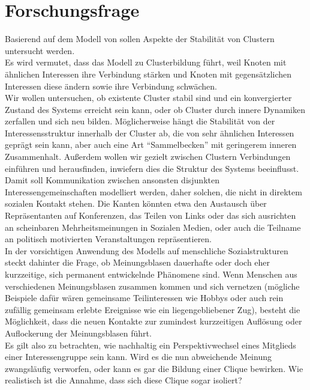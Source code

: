 \documentclass[11pt, a4paper]{scrartcl}
\begin{document}
\section{Forschungsfrage}

Basierend auf dem Modell von \autocite{Koehler-Bussmeier2018} sollen Aspekte der Stabilität von Clustern untersucht werden.
\\
Es wird vermutet, dass das Modell zu Clusterbildung führt, weil Knoten mit ähnlichen Interessen ihre Verbindung stärken und Knoten mit gegensätzlichen Interessen diese ändern sowie ihre Verbindung schwächen.
\\
Wir wollen untersuchen, ob existente Cluster stabil sind und ein konvergierter Zustand des Systems erreicht sein kann, oder ob Cluster durch innere Dynamiken zerfallen und sich neu bilden. Möglicherweise hängt die Stabilität von der Interessensstruktur innerhalb der Cluster ab, die von sehr ähnlichen Interessen geprägt sein kann, aber auch eine Art "`Sammelbecken"' mit geringerem inneren Zusammenhalt. Außerdem wollen wir gezielt zwischen Clustern Verbindungen einführen und herausfinden, inwiefern dies die Struktur des Systems beeinflusst.
\\
Damit soll Kommunikation zwischen ansonsten disjunkten Interessengemeinschaften modelliert werden, daher solchen, die nicht in direktem sozialen Kontakt stehen. Die Kanten könnten etwa den Austausch über Repräsentanten auf Konferenzen,  das Teilen von Links oder das sich ausrichten an scheinbaren Mehrheitsmeinungen in Sozialen Medien, oder auch die Teilname an politisch motivierten Veranstaltungen repräsentieren.
\\
In der vorsichtigen Anwendung des Modells auf menschliche Sozialstrukturen steckt dahinter die Frage, ob Meinungsblasen dauerhafte oder doch eher kurzzeitige, sich permanent entwickelnde Phänomene sind. Wenn Menschen aus verschiedenen Meinungsblasen zusammen kommen und sich vernetzen (mögliche Beispiele dafür wären gemeinsame Teilinteressen wie Hobbys oder auch rein zufällig gemeinsam erlebte Ereignisse wie ein liegengebliebener Zug), besteht die Möglichkeit, dass die neuen Kontakte zur zumindest kurzzeitigen Auflösung oder Auflockerung der Meinungsblasen führt. 
\\
Es gilt also zu betrachten, wie nachhaltig ein Perspektivwechsel eines Mitglieds einer Interessengruppe sein kann. Wird es die nun abweichende Meinung zwangsläufig verworfen, oder kann es gar die Bildung einer Clique bewirken. Wie realistisch ist die Annahme, dass sich diese Clique sogar isoliert?
\end{document}
